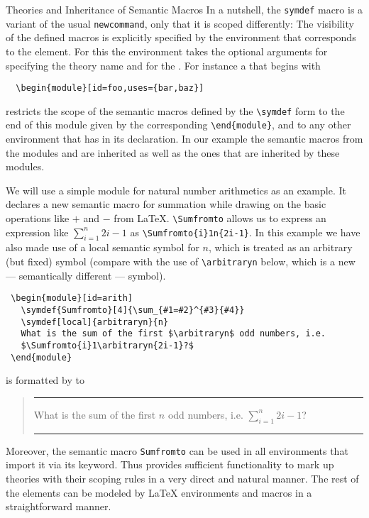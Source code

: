 \begin{omgroup}[id=stex,creators=miko]
\begin{omgroup}{Theories and Inheritance of Semantic Macros}
  In a nutshell, the {\stex} {\verb|symdef|} macro is a variant of the usual
  {\verb|newcommand|}, only that it is scoped differently: The visibility of the defined
  macros is explicitly specified by the {} environment that corresponds to
  the {\omdoc} {} element.  For this the {} environment
  takes the optional {} arguments {} for specifying the theory
  name and {} for the {}. For
  instance a {} that begins with
\begin{lstlisting}
  \begin{module}[id=foo,uses={bar,baz}]
\end{lstlisting}
restricts the scope of the semantic macros defined by the {\verb|\symdef|} form to the end of
this module given by the corresponding {\verb|\end{module}|}, and to any other
{} environment that has {\snippet{[uses=\{\ldots,foo,\ldots\}]}} in its
declaration. In our example the semantic macros from the modules {}
and {} are inherited as well as the ones that are inherited by these modules.

We will use a simple module for natural number arithmetics as an example. It declares a
new semantic macro for summation while drawing on the basic operations like $+$ and $-$
from {\LaTeX}.  {\verb|\Sumfromto|} allows us to express an expression like $\sum_{i=1}^n
2i-1$ as {\verb|\Sumfromto{i}1n{2i-1}|}. In this example we have also made use of a local
semantic symbol for $n$, which is treated as an arbitrary (but fixed) symbol (compare with
the use of {\verb|\arbitraryn|} below, which is a new --- semantically different ---
symbol).
\begin{lstlisting}
 \begin{module}[id=arith]
   \symdef{Sumfromto}[4]{\sum_{#1=#2}^{#3}{#4}}
   \symdef[local]{arbitraryn}{n}
   What is the sum of the first $\arbitraryn$ odd numbers, i.e.
   $\Sumfromto{i}1\arbitraryn{2i-1}?$
 \end{module}
\end{lstlisting}
is formatted by {\sTeX} to
\begin{quote}\hrule
  What is the sum of the first $n$ odd numbers, i.e.  $\sum_{i=1}^n{2i-1}$?\hrule
\end{quote}
Moreover, the semantic macro {\verb|Sumfromto|} can be used in all {}
environments that import it via its {} keyword. Thus {\stex} provides
sufficient functionality to mark up {\omdoc} theories with their scoping rules in a very
direct and natural manner. The rest of the {\omdoc} elements can be modeled by {\LaTeX}
environments and macros in a straightforward manner.


\end{omgroup}
\end{omgroup}
